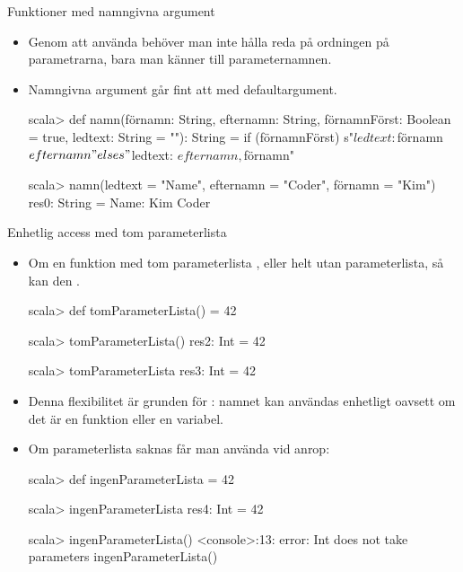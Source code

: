 \begin{Slide}{Funktioner med namngivna argument}
\begin{itemize}
\item Genom att använda  behöver man inte hålla reda på ordningen på parametrarna, bara man känner till parameternamnen.
\item Namngivna argument går fint att  med defaultargument.
\begin{REPL}
scala> def namn(förnamn: String,
                efternamn: String,
                förnamnFörst: Boolean = true,
                ledtext: String = ""): String =
         if (förnamnFörst) s"$ledtext: $förnamn $efternamn"
         else s"$ledtext: $efternamn, $förnamn"

scala> namn(ledtext = "Name", efternamn = "Coder", förnamn = "Kim")
res0: String = Name: Kim Coder
\end{REPL}
\end{itemize}
\end{Slide}


\begin{Slide}{Enhetlig access med tom parameterlista}\SlideFontSmall
\begin{itemize}
\item Om en funktion  med tom parameterlista \code{()}, eller helt utan parameterlista, så kan den  .
\begin{REPL}
scala> def tomParameterLista() = 42

scala> tomParameterLista()
res2: Int = 42

scala> tomParameterLista
res3: Int = 42
\end{REPL}

\item Denna flexibilitet är grunden för : namnet kan användas enhetligt oavsett om det är en funktion eller en variabel.
\item Om parameterlista saknas får man  använda \code{()} vid anrop:

\begin{REPL}
scala> def ingenParameterLista = 42

scala> ingenParameterLista
res4: Int = 42

scala> ingenParameterLista()
<console>:13: error: Int does not take parameters
       ingenParameterLista()
\end{REPL}

\end{itemize}
\end{Slide}



